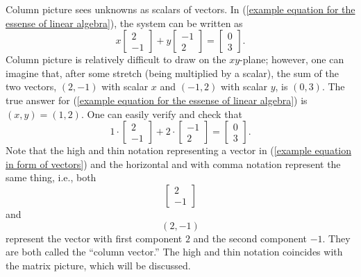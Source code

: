 \documentclass[11pt]{article}
\theoremstyle{break}
\theoremstyle{no_label}
\numberwithin{equation}{theorem}
\begin{document}
Column picture sees unknowns as scalars of vectors. In (\ref{example equation for the essense of linear algebra}), the system can be written as 
\begin{equation}\label{example equation in form of vectors}
    x\begin{bmatrix}
        2 \\ -1
    \end{bmatrix}+y\begin{bmatrix}
        -1 \\ 2
    \end{bmatrix}=\begin{bmatrix}
        0 \\ 3
    \end{bmatrix}.
\end{equation}
Column picture is relatively difficult to draw on the $xy$-plane; however, one can imagine that, after some stretch (being multiplied by a scalar), the sum of the two vectors, $(2, -1)$ with scalar $x$ and $(-1, 2)$ with scalar $y$, is $(0, 3)$. The true answer for (\ref{example equation for the essense of linear algebra}) is $(x, y)=(1, 2)$. One can easily verify and check that 
\begin{equation*}
    1\cdot\begin{bmatrix}
        2 \\ -1
    \end{bmatrix}+2\cdot\begin{bmatrix}
        -1 \\ 2
    \end{bmatrix}=\begin{bmatrix}
        0 \\ 3
    \end{bmatrix}.
\end{equation*}
Note that the high and thin notation representing a vector in (\ref{example equation in form of vectors}) and the horizontal and with comma notation represent the same thing, i.e., both \begin{equation*}
    \begin{bmatrix}
        2 \\ -1
    \end{bmatrix}
\end{equation*}
and
\begin{equation*}
    (2, -1)
\end{equation*}
represent the vector with first component $2$ and the second component $-1$. They are both called the ``column vector.'' The high and thin notation coincides with the matrix picture, which will be discussed.
\end{document}
